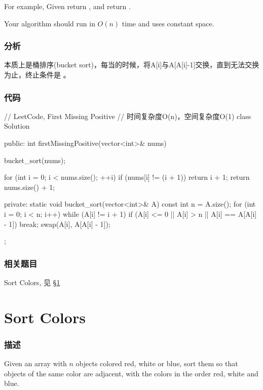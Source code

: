 For example,
Given \fn{[1,2,0]} return ,
and \fn{[3,4,-1,1]} return .

Your algorithm should run in $O(n)$ time and uses constant space.


\subsubsection{分析}
本质上是桶排序(bucket sort)，每当的时候，将A[i]与A[A[i]-1]交换，直到无法交换为止，终止条件是 。


\subsubsection{代码}
\begin{Code}
// LeetCode, First Missing Positive
// 时间复杂度O(n)，空间复杂度O(1)
class Solution {
public:
    int firstMissingPositive(vector<int>& nums) {
        bucket_sort(nums);

        for (int i = 0; i < nums.size(); ++i)
            if (nums[i] != (i + 1))
                return i + 1;
        return nums.size() + 1;
    }
private:
    static void bucket_sort(vector<int>& A) {
        const int n = A.size();
        for (int i = 0; i < n; i++) {
            while (A[i] != i + 1) {
                if (A[i] <= 0 || A[i] > n || A[i] == A[A[i] - 1])
                    break;
                swap(A[i], A[A[i] - 1]);
            }
        }
    }
};
\end{Code}


\subsubsection{相关题目}
\begindot
\item Sort Colors, 见 \S \ref{sec:sort-colors}
\myenddot


\section{Sort Colors} %
\label{sec:sort-colors}


\subsubsection{描述}
Given an array with $n$ objects colored red, white or blue, sort them so that objects of the same color are adjacent, with the colors in the order red, white and blue.

